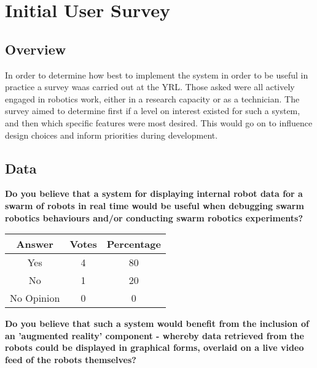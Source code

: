 
\chapter[Initial User Survey]{Initial User Survey} %

\label{Chapter7} %


\section{Overview}
In order to determine how best to implement the system in order to be useful in practice a survey waas carried out at the YRL. Those asked were all actively engaged in robotics work, either in a research capacity or as a technician. The survey aimed to determine first if a level on interest existed for such a system, and then which specific features were most desired. This would go on to influence design choices and inform priorities during development.


\section{Data}
\textbf{Do you believe that a system for displaying internal robot data for a swarm of robots in real time would be useful when debugging swarm robotics behaviours and/or conducting swarm robotics experiments?}

\begin{center}
\begin{tabular}{ c c c }
 Answer & Votes & Percentage \\ 
 \hline
 Yes & 4 & 80 \\ 
 No & 1 & 20 \\
 No Opinion & 0 & 0 \\
\end{tabular}
\end{center}

\vspace{1cm}

\textbf{Do you believe that such a system would benefit from the inclusion of an 'augmented reality' component - whereby data retrieved from the robots could be displayed in graphical forms, overlaid on a live video feed of the robots themselves?}

